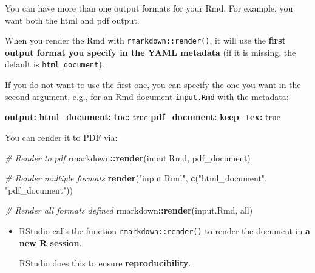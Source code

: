 \documentclass[
  a4paper,
  twoside,
  openright]{book}
\newenvironment{Shaded}{\begin{snugshade}}{\end{snugshade}}
\newcommand{\AttributeTok}[1]{\textcolor[rgb]{0.13,0.29,0.53}{#1}}
\newcommand{\CharTok}[1]{\textcolor[rgb]{0.31,0.60,0.02}{#1}}
\newcommand{\CommentTok}[1]{\textcolor[rgb]{0.56,0.35,0.01}{\textit{#1}}}
\newcommand{\FunctionTok}[1]{\textcolor[rgb]{0.13,0.29,0.53}{\textbf{#1}}}
\newcommand{\KeywordTok}[1]{\textcolor[rgb]{0.13,0.29,0.53}{\textbf{#1}}}
\newcommand{\NormalTok}[1]{#1}
\newcommand{\SpecialCharTok}[1]{\textcolor[rgb]{0.81,0.36,0.00}{\textbf{#1}}}
\newcommand{\StringTok}[1]{\textcolor[rgb]{0.31,0.60,0.02}{#1}}
\theoremstyle{definition}
\theoremstyle{definition}
\theoremstyle{definition}
\theoremstyle{definition}
\theoremstyle{remark}
\begin{document}
You can have more than one output formats for your Rmd. For example, you want both the html and pdf output.

When you render the Rmd with \texttt{rmarkdown::render()}, it will use the \textbf{first output format you specify in the YAML metadata} (if it is missing, the default is \texttt{html\_document}).

If you do not want to use the first one, you can specify the one you want in the second argument, e.g., for an Rmd document \texttt{input.Rmd} with the metadata:

\begin{Shaded}
\begin{Highlighting}[]
\FunctionTok{output}\KeywordTok{:}
\AttributeTok{  }\FunctionTok{html\_document}\KeywordTok{:}
\AttributeTok{    }\FunctionTok{toc}\KeywordTok{:}\AttributeTok{ }\CharTok{true}
\AttributeTok{  }\FunctionTok{pdf\_document}\KeywordTok{:}
\AttributeTok{    }\FunctionTok{keep\_tex}\KeywordTok{:}\AttributeTok{ }\CharTok{true}
\end{Highlighting}
\end{Shaded}

You can render it to PDF via:

\begin{Shaded}
\begin{Highlighting}[]
\CommentTok{\# Render to pdf}
\NormalTok{rmarkdown}\SpecialCharTok{::}\FunctionTok{render}\NormalTok{(}\StringTok{\textquotesingle{}input.Rmd\textquotesingle{}}\NormalTok{, }\StringTok{\textquotesingle{}pdf\_document\textquotesingle{}}\NormalTok{)}

\CommentTok{\# Render multiple formats}
\FunctionTok{render}\NormalTok{(}\StringTok{"input.Rmd"}\NormalTok{, }\FunctionTok{c}\NormalTok{(}\StringTok{"html\_document"}\NormalTok{, }\StringTok{"pdf\_document"}\NormalTok{))}

\CommentTok{\# Render all formats defined}
\NormalTok{rmarkdown}\SpecialCharTok{::}\FunctionTok{render}\NormalTok{(}\StringTok{\textquotesingle{}input.Rmd\textquotesingle{}}\NormalTok{, }\StringTok{\textquotesingle{}all\textquotesingle{}}\NormalTok{)}
\end{Highlighting}
\end{Shaded}

\begin{itemize}
\item
  RStudio calls the function \texttt{rmarkdown::render()} to render the document in \textbf{a new R session}.

  RStudio does this to ensure \textbf{reproducibility}.
\end{itemize}
\end{document}
